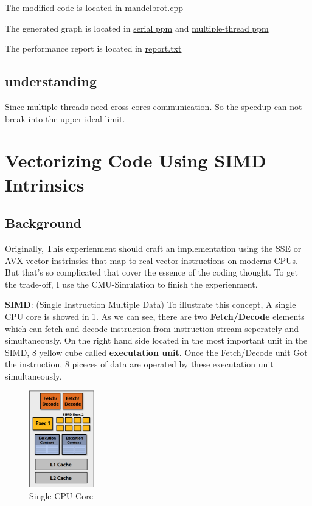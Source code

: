 \documentclass[a4paper]{article}
\begin{document}
The modified code is located in \href{https://github.com/GiganticRay/CMU-418618HW/blob/main/asst1-f18/prog1_mandelbrot_threads/mandelbrot.cpp}{mandelbrot.cpp}

The generated graph is located in \href{https://github.com/GiganticRay/CMU-418618HW/blob/main/asst1-f18/prog1_mandelbrot_threads/mandelbrot-serial.ppm}{serial ppm} and \href{https://github.com/GiganticRay/CMU-418618HW/blob/main/asst1-f18/prog1_mandelbrot_threads/mandelbrot-thread.ppm}{multiple-thread ppm}

The performance report is located in \href{https://github.com/GiganticRay/CMU-418618HW/blob/main/asst1-f18/prog1_mandelbrot_threads/report.txt}{report.txt}

\subsection{understanding}
Since multiple threads need cross-cores communication. So the speedup can not break into the upper ideal limit.



\section{Vectorizing Code Using SIMD Intrinsics}
\subsection{Background}
Originally, This experienment should craft an implementation using the SSE or AVX vector instrinsics that map to real vector instructions on moderns CPUs. But that's so complicated that cover the essence of the coding thought. To get the trade-off, I use the CMU-Simulation to finish the experienment.



\textbf{SIMD}: (Single Instruction Multiple Data) To illustrate this concept, A single CPU core is showed in \ref{fig:Single-Cpu-Core}. As we can see, there are two \textbf{Fetch/Decode} elements which can fetch and decode instruction from instruction stream seperately and simultaneously. On the right hand side located in the most important unit in the SIMD, 8 yellow cube called \textbf{executation unit}. Once the Fetch/Decode unit Got the instruction, 8 piceces of data are operated by these executation unit simultaneously.

\begin{figure}[h]
    \centering
    \includegraphics[width=0.25\textwidth]{figures/Single CPU Core.png}
    \caption{Single CPU Core}
    \label{fig:Single-Cpu-Core}
\end{figure}
\end{document}
